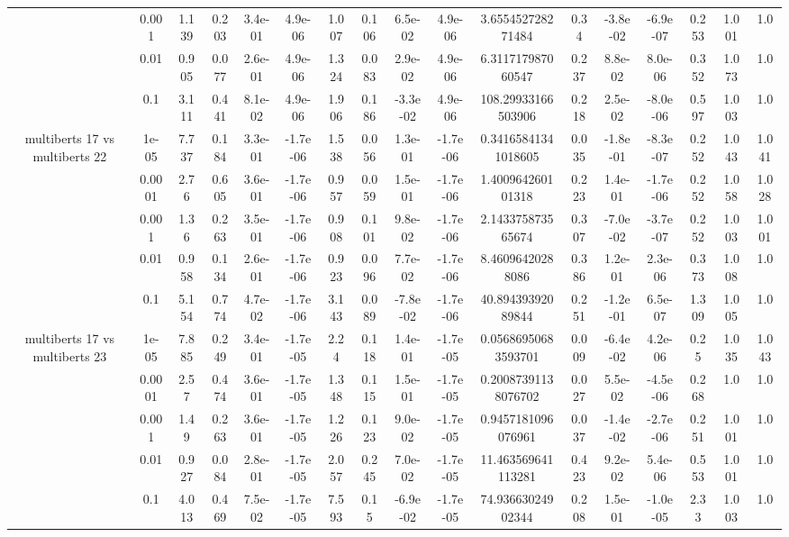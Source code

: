 \begin{tabular}{|c|c|c|c|c|c|c|c|c|c|c|c|c|c|c|c|c|}
 & 0.001 & 1.139 & 0.203 & 3.4e-01 & 4.9e-06 & 1.007 & 0.106 & 6.5e-02 & 4.9e-06 & 3.655452728271484 & 0.34 & -3.8e-02 & -6.9e-07 & 0.253 & 1.001 & 1.0 \\
 & 0.01 & 0.905 & 0.077 & 2.6e-01 & 4.9e-06 & 1.324 & 0.083 & 2.9e-02 & 4.9e-06 & 6.311717987060547 & 0.237 & 8.8e-02 & 8.0e-06 & 0.352 & 1.073 & 1.0 \\
 & 0.1 & 3.111 & 0.441 & 8.1e-02 & 4.9e-06 & 1.906 & 0.186 & -3.3e-02 & 4.9e-06 & 108.29933166503906 & 0.218 & 2.5e-02 & -8.0e-06 & 0.597 & 1.003 & 1.0 \\
\hline
\multirow{5}{*}{multiberts 17 vs multiberts 22} & 1e-05 & 7.737 & 0.184 & 3.3e-01 & -1.7e-06 & 1.538 & 0.056 & 1.3e-01 & -1.7e-06 & 0.34165841341018605 & 0.035 & -1.8e-01 & -8.3e-07 & 0.252 & 1.043 & 1.041 \\
 & 0.0001 & 2.76 & 0.605 & 3.6e-01 & -1.7e-06 & 0.957 & 0.059 & 1.5e-01 & -1.7e-06 & 1.400964260101318 & 0.223 & 1.4e-01 & -1.7e-06 & 0.252 & 1.058 & 1.028 \\
 & 0.001 & 1.36 & 0.263 & 3.5e-01 & -1.7e-06 & 0.908 & 0.101 & 9.8e-02 & -1.7e-06 & 2.143375873565674 & 0.307 & -7.0e-02 & -3.7e-07 & 0.252 & 1.003 & 1.001 \\
 & 0.01 & 0.958 & 0.134 & 2.6e-01 & -1.7e-06 & 0.923 & 0.096 & 7.7e-02 & -1.7e-06 & 8.46096420288086 & 0.386 & 1.2e-01 & 2.3e-06 & 0.373 & 1.008 & 1.0 \\
 & 0.1 & 5.154 & 0.774 & 4.7e-02 & -1.7e-06 & 3.143 & 0.089 & -7.8e-02 & -1.7e-06 & 40.89439392089844 & 0.251 & -1.2e-01 & 6.5e-07 & 1.309 & 1.005 & 1.0 \\
\hline
\multirow{5}{*}{multiberts 17 vs multiberts 23} & 1e-05 & 7.885 & 0.249 & 3.4e-01 & -1.7e-05 & 2.24 & 0.118 & 1.4e-01 & -1.7e-05 & 0.05686950683593701 & 0.009 & -6.4e-02 & 4.2e-06 & 0.25 & 1.035 & 1.043 \\
 & 0.0001 & 2.57 & 0.474 & 3.6e-01 & -1.7e-05 & 1.348 & 0.115 & 1.5e-01 & -1.7e-05 & 0.20087391138076702 & 0.027 & 5.5e-02 & -4.5e-06 & 0.268 & 1.0 & 1.0 \\
 & 0.001 & 1.49 & 0.263 & 3.6e-01 & -1.7e-05 & 1.226 & 0.123 & 9.0e-02 & -1.7e-05 & 0.9457181096076961 & 0.037 & -1.4e-02 & -2.7e-06 & 0.251 & 1.001 & 1.0 \\
 & 0.01 & 0.927 & 0.084 & 2.8e-01 & -1.7e-05 & 2.057 & 0.245 & 7.0e-02 & -1.7e-05 & 11.463569641113281 & 0.423 & 9.2e-02 & 5.4e-06 & 0.553 & 1.001 & 1.0 \\
 & 0.1 & 4.013 & 0.469 & 7.5e-02 & -1.7e-05 & 7.593 & 0.15 & -6.9e-02 & -1.7e-05 & 74.93663024902344 & 0.208 & 1.5e-01 & -1.0e-05 & 2.33 & 1.003 & 1.0 \\

\end{tabular}
